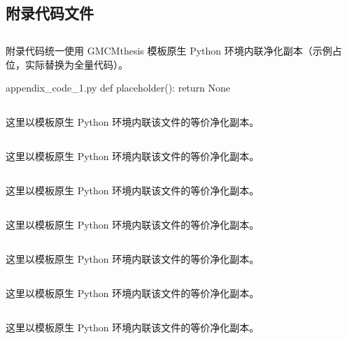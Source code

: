 \documentclass[bwprint]{gmcmthesis}
\begin{document}
\begin{appendices}
\section{附录代码文件}

\subsection{}

附录代码统一使用 GMCMthesis 模板原生 Python 环境内联净化副本（示例占位，实际替换为全量代码）。

\begin{Python}{appendix\_code\_1.py}
def placeholder():
    return None
\end{Python}

\subsection{}

这里以模板原生 Python 环境内联该文件的等价净化副本。

\subsection{}

这里以模板原生 Python 环境内联该文件的等价净化副本。

\subsection{}

这里以模板原生 Python 环境内联该文件的等价净化副本。

\subsection{}

这里以模板原生 Python 环境内联该文件的等价净化副本。

\subsection{}

这里以模板原生 Python 环境内联该文件的等价净化副本。

\subsection{}

这里以模板原生 Python 环境内联该文件的等价净化副本。

\subsection{}

这里以模板原生 Python 环境内联该文件的等价净化副本。

\end{appendices}
\end{document}
